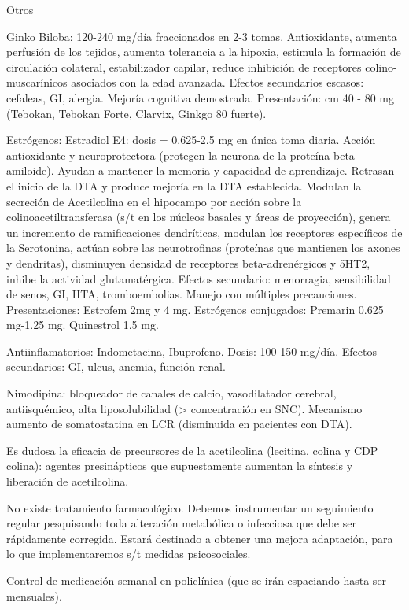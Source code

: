 \documentclass{scrbook}
\begin{document}
Otros

Ginko Biloba: 120-240 mg/día fraccionados en 2-3 tomas. Antioxidante, aumenta perfusión de los tejidos, aumenta tolerancia a la hipoxia, estimula la formación de circulación colateral, estabilizador capilar, reduce inhibición de receptores colino-muscarínicos asociados con la edad avanzada. Efectos secundarios escasos: cefaleas, GI, alergia. Mejoría cognitiva demostrada. Presentación: cm 40 - 80 mg (Tebokan, Tebokan Forte, Clarvix, Ginkgo 80 fuerte).

Estrógenos: Estradiol E4: dosis = 0.625-2.5 mg en única toma diaria. Acción antioxidante y neuroprotectora (protegen la neurona de la proteína beta-amiloide). Ayudan a mantener la memoria y capacidad de aprendizaje. Retrasan el inicio de la DTA y produce mejoría en la DTA establecida. Modulan la secreción de Acetilcolina en el hipocampo por acción sobre la colinoacetiltransferasa (s/t en los núcleos basales y áreas de proyección), genera un incremento de ramificaciones dendríticas, modulan los receptores específicos de la Serotonina, actúan sobre las neurotrofinas (proteínas que mantienen los axones y dendritas), disminuyen densidad de receptores beta-adrenérgicos y 5HT2, inhibe la actividad glutamatérgica. Efectos secundario: menorragia, sensibilidad de senos, GI, HTA, tromboembolias. Manejo con múltiples precauciones. Presentaciones: Estrofem 2mg y 4 mg. Estrógenos conjugados: Premarin 0.625 mg-1.25 mg. Quinestrol 1.5 mg.

Antiinflamatorios: Indometacina, Ibuprofeno. Dosis: 100-150 mg/día. Efectos secundarios: GI, ulcus, anemia, función renal.

Nimodipina: bloqueador de canales de calcio, vasodilatador cerebral, antiisquémico, alta liposolubilidad (> concentración en SNC). Mecanismo aumento de somatostatina en LCR (disminuida en pacientes con DTA).

Es dudosa la eficacia de precursores de la acetilcolina (lecitina, colina y CDP colina): agentes presinápticos que supuestamente aumentan la síntesis y liberación de acetilcolina.

No existe tratamiento farmacológico. Debemos instrumentar un seguimiento regular pesquisando toda alteración metabólica o infecciosa que debe ser rápidamente corregida. Estará destinado a obtener una mejora adaptación, para lo que implementaremos s/t medidas psicosociales.

Control de medicación semanal en policlínica (que se irán espaciando hasta ser mensuales).
\end{document}
